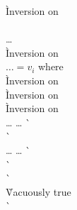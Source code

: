 \begin{description}
\begin{tabbing}
    \` Inversion on  \\
  \\
   \ldots {} \\
    \` Inversion on  \\
  $\ldots = { v_i }$ where  \\
    \` Inversion on  \\
    \` Inversion on  \\
    \` Inversion on  \\
  \ldots {} \ldots
    \`  \\
    \`  \\
  \ldots {} \ldots
    \`  \\
    \`  \\
    \`  \\
    \` Vacuously true \\
    \`  \\
  \end{tabbing}


\end{description}
